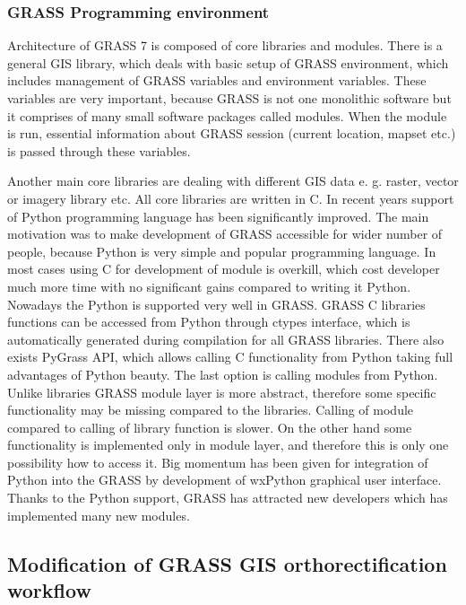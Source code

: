 \documentclass[a4paper,12pt]{article}
\begin{document}
\subsubsection{GRASS Programming  environment}

Architecture of GRASS 7 is composed of core libraries and modules. There is a general GIS library, which 
deals with basic setup of GRASS environment, which includes management of
GRASS variables and environment variables. These variables are very important, because GRASS is not one monolithic software 
but it comprises of many small software packages called modules. When the module is run, essential information 
about GRASS session (current location, mapset etc.) is passed through these variables. 

Another main core libraries are dealing with different GIS data e. g. raster, vector or imagery library etc. 
All core libraries are written in C. In recent years support of Python programming language has been significantly 
improved. The main motivation was to make development of GRASS accessible for wider number 
of people, because Python is very simple and popular programming language. In most cases using 
C for development of module is overkill, which cost developer much more time 
with no significant gains compared to writing it Python. Nowadays the Python is supported very well in GRASS.
GRASS C libraries functions can be accessed from Python through ctypes interface, which is automatically generated during compilation
for all GRASS libraries.  
There also exists 
PyGrass API, which allows calling C functionality from Python taking full advantages of Python beauty.
The last option is calling modules from Python. Unlike libraries GRASS module layer is more abstract, 
therefore some specific functionality may be missing compared to the libraries. Calling of module
compared to calling of library function is slower.
On the other hand some functionality is implemented
only in module layer, and therefore this is only one possibility how to access it.
Big momentum has been given for integration of Python into the GRASS by development of wxPython graphical
user interface. 
Thanks to the Python support, GRASS has attracted new developers which has implemented many new modules.

\subsection{Modification of GRASS GIS orthorectification workflow}
\end{document}
